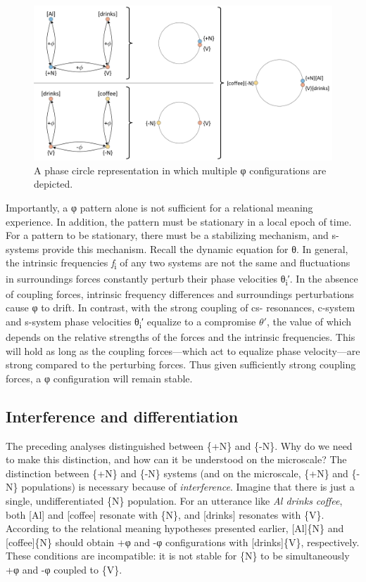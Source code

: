   
\begin{figure}
\includegraphics[width=\textwidth]{figures/Tilsen-img22.png}
\caption{A phase circle representation in which multiple φ configurations are depicted.}
\label{fig:2:15}
\end{figure}
 

  Importantly, a φ pattern alone is not sufficient for a relational meaning experience. In addition, the pattern must be stationary in a local epoch of time. For a pattern to be stationary, there must be a stabilizing mechanism, and s-systems provide this mechanism. Recall the dynamic equation for θ. In general, the intrinsic frequencies \textit{f}\textsubscript{i} of any two systems are not the same and fluctuations in surroundings forces constantly perturb their phase velocities θ\textsubscript{i}′. In the absence of coupling forces, intrinsic frequency differences and surroundings perturbations cause φ to drift. In contrast, with the strong coupling of cs- resonances, c-system and s-system phase velocities θ\textsubscript{i}′ equalize to a compromise $\theta ′$, the value of which depends on the relative strengths of the forces and the intrinsic frequencies. This will hold as long as the coupling forces—which act to equalize phase velocity—are strong compared to the perturbing forces. Thus given sufficiently strong coupling forces, a φ configuration will remain stable.

\subsection{Interference and differentiation}

The preceding analyses distinguished between \{+N\} and \{-N\}. Why do we need to make this distinction, and how can it be understood on the microscale? The distinction between \{+N\} and \{-N\} systems (and on the microscale, \{+N\} and \{-N\} populations) is necessary because of \textit{interference}. Imagine that there is just a single, undifferentiated \{N\} population. For an utterance like \textit{Al drinks coffee}, both [Al] and [coffee] resonate with \{N\}, and [drinks] resonates with \{V\}. According to the relational meaning hypotheses presented earlier, [Al]\{N\} and [coffee]\{N\} should obtain +φ and -φ configurations with [drinks]\{V\}, respectively. These conditions are incompatible: it is not stable for \{N\} to be simultaneously +φ and -φ coupled to \{V\}.


